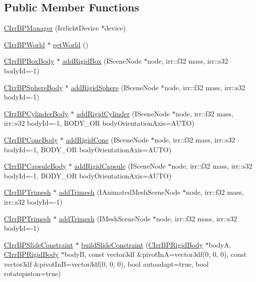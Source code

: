 \subsection*{Public Member Functions}
\begin{DoxyCompactItemize}
\item 
\hyperlink{class_c_irr_b_p_manager_ae449dd7e0fa17f986a8ee2b6afe36a09}{CIrrBPManager} (IrrlichtDevice $\ast$device)
\item 
\hyperlink{class_c_irr_b_p_world}{CIrrBPWorld} $\ast$ \hyperlink{class_c_irr_b_p_manager_acdfaf5f8c351d72c4d9680cb75372ae3}{getWorld} ()
\item 
\hyperlink{class_c_irr_b_p_box_body}{CIrrBPBoxBody} $\ast$ \hyperlink{class_c_irr_b_p_manager_a61ed9d76cfe90285f6e7d80b5870406f}{addRigidBox} (ISceneNode $\ast$node, irr::f32 mass, irr::s32 bodyId=-\/1)
\item 
\hyperlink{class_c_irr_b_p_sphere_body}{CIrrBPSphereBody} $\ast$ \hyperlink{class_c_irr_b_p_manager_aebbe19de8a748a7c66d5d0efc16dc5eb}{addRigidSphere} (ISceneNode $\ast$node, irr::f32 mass, irr::s32 bodyId=-\/1)
\item 
\hyperlink{class_c_irr_b_p_cylinder_body}{CIrrBPCylinderBody} $\ast$ \hyperlink{class_c_irr_b_p_manager_a7866f42ff533e69342c9ad370f07aa23}{addRigidCylinder} (ISceneNode $\ast$node, irr::f32 mass, irr::s32 bodyId=-\/1, BODY\_\-OR bodyOrientationAxis=AUTO)
\item 
\hyperlink{class_c_irr_b_p_cone_body}{CIrrBPConeBody} $\ast$ \hyperlink{class_c_irr_b_p_manager_a810377e264480789138dc4b9ac5145d4}{addRigidCone} (ISceneNode $\ast$node, irr::f32 mass, irr::s32 bodyId=-\/1, BODY\_\-OR bodyOrientationAxis=AUTO)
\item 
\hyperlink{class_c_irr_b_p_capsule_body}{CIrrBPCapsuleBody} $\ast$ \hyperlink{class_c_irr_b_p_manager_ac351ba81cf28a33bac69bc348860cd48}{addRigidCapsule} (ISceneNode $\ast$node, irr::f32 mass, irr::s32 bodyId=-\/1, BODY\_\-OR bodyOrientationAxis=AUTO)
\item 
\hyperlink{class_c_irr_b_p_trimesh}{CIrrBPTrimesh} $\ast$ \hyperlink{class_c_irr_b_p_manager_ad565fee43722307839908de9aab70344}{addTrimesh} (IAnimatedMeshSceneNode $\ast$node, irr::f32 mass, irr::s32 bodyId=-\/1)
\item 
\hyperlink{class_c_irr_b_p_trimesh}{CIrrBPTrimesh} $\ast$ \hyperlink{class_c_irr_b_p_manager_a14eef4c19ac93cf7dff82544637833e0}{addTrimesh} (IMeshSceneNode $\ast$node, irr::f32 mass, irr::s32 bodyId=-\/1)
\item 
\hyperlink{class_c_irr_b_p_slide_constraint}{CIrrBPSlideConstraint} $\ast$ \hyperlink{class_c_irr_b_p_manager_af916152de29ba8c7c9e727dfe5a1c8af}{buildSlideConstraint} (\hyperlink{class_c_irr_b_p_rigid_body}{CIrrBPRigidBody} $\ast$bodyA, \hyperlink{class_c_irr_b_p_rigid_body}{CIrrBPRigidBody} $\ast$bodyB, const vector3df \&pivotInA=vector3df(0, 0, 0), const vector3df \&pivotInB=vector3df(0, 0, 0), bool autoadapt=true, bool rotatepiston=true)

\end{DoxyCompactItemize}
